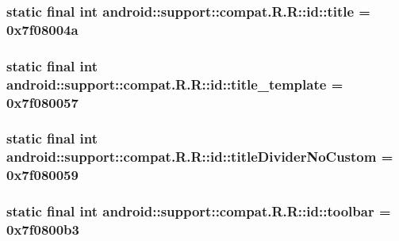 \hypertarget{classandroid_1_1support_1_1compat_1_1_r_1_1id_a78df6a9ea262a850ef565e934043334}{
\subsubsection[{title}]{\setlength{\rightskip}{0pt plus 5cm}static final int android::support::compat.R.R::id::title = 0x7f08004a}}
\label{classandroid_1_1support_1_1compat_1_1_r_1_1id_a78df6a9ea262a850ef565e934043334}


\hypertarget{classandroid_1_1support_1_1compat_1_1_r_1_1id_03cd7bc3273250073e676854c4e8c252}{
\subsubsection[{title\_\-template}]{\setlength{\rightskip}{0pt plus 5cm}static final int android::support::compat.R.R::id::title\_\-template = 0x7f080057}}
\label{classandroid_1_1support_1_1compat_1_1_r_1_1id_03cd7bc3273250073e676854c4e8c252}


\hypertarget{classandroid_1_1support_1_1compat_1_1_r_1_1id_11d0fc891a3687ec96641730777bb491}{
\subsubsection[{titleDividerNoCustom}]{\setlength{\rightskip}{0pt plus 5cm}static final int android::support::compat.R.R::id::titleDividerNoCustom = 0x7f080059}}
\label{classandroid_1_1support_1_1compat_1_1_r_1_1id_11d0fc891a3687ec96641730777bb491}


\hypertarget{classandroid_1_1support_1_1compat_1_1_r_1_1id_91509ca78822f6fce391d9ea3218be7b}{
\subsubsection[{toolbar}]{\setlength{\rightskip}{0pt plus 5cm}static final int android::support::compat.R.R::id::toolbar = 0x7f0800b3}}
\label{classandroid_1_1support_1_1compat_1_1_r_1_1id_91509ca78822f6fce391d9ea3218be7b}


